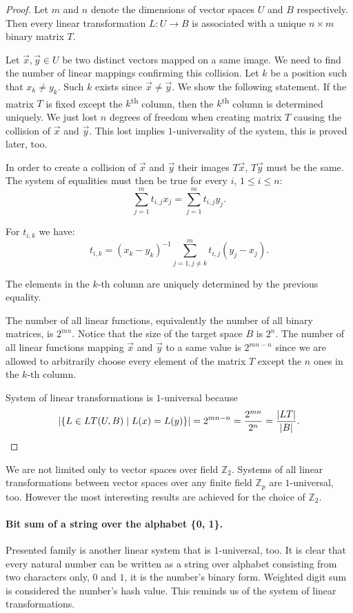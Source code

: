 \begin{proof}
Let $m$ and $n$ denote the dimensions of vector spaces $U$ and $B$ respectively. Then every linear transformation $L: U \rightarrow B$ is associated with a unique $n \times m$ binary matrix $T$. 

Let $\vec{x}, \vec{y} \in U$ be two distinct vectors mapped on a same image. We need to find the number of linear mappings confirming this collision. Let $k$ be a position such that $x_k \neq y_k$. Such $k$ exists since $\vec{x} \neq \vec{y}$. We show the following statement. If the matrix $T$ is fixed except the $k$\textsuperscript{th} column, then the $k$\textsuperscript{th} column is determined uniquely. We just lost $n$ degrees of freedom when creating matrix $T$ causing the collision of $\vec{x}$ and $\vec{y}$. This lost implies $1$-universality of the system, this is proved later, too.

In order to create a collision of $\vec{x}$ and $\vec{y}$ their images $T\vec{x}$, $T\vec{y}$ must be the same. The system of equalities must then be true for every $i$, $1 \leq i \leq n$:
\[
\displaystyle\sum_{j = 1}^{m}t_{i, j}x_j = \displaystyle\sum_{j = 1}^{m}t_{i, j}y_j \text{.}
\]

For $t_{i, k}$ we have:
\[
t_{i, k} = (x_k - y_k)^{-1}\displaystyle\sum_{j = 1, j \neq k}^{m}t_{i, j}(y_j - x_j) \text{.}
\]

The elements in the $k$-th column are uniquely determined by the previous equality. 

The number of all linear functions, equivalently the number of all binary matrices, is $2^{mn}$. Notice that the size of the target space $B$ is $2^n$. The number of all linear functions mapping $\vec{x}$ and $\vec{y}$ to a same value is $2^{mn - n}$ since we are allowed to arbitrarily choose every element of the matrix $T$ except the $n$ ones in the $k$-th column. 

System of linear transformations is $1$-universal because
\[
|\{ L \in LT(U, B) \mid L(x) = L(y) \}| = 2^{mn - n} = \frac{2^{mn}}{2^n} = \frac{|LT|}{|B|} \text{.}
\]
\end{proof}

We are not limited only to vector spaces over field $\mathbb{Z}_2$. Systems of all linear transformations between vector spaces over any finite field $\mathbb{Z}_p$ are $1$-universal, too. However the most interesting results are achieved for the choice of $\mathbb{Z}_2$.

\paragraph{Bit sum of a string over the alphabet \{0, 1\}.}
Presented family is another linear system that is $1$-universal, too. It is clear that every natural number can be written as a string over alphabet consisting from two characters only, $0$ and $1$, it is the number's binary form. Weighted digit sum is considered the number's hash value. This reminds us of the system of linear transformations.

